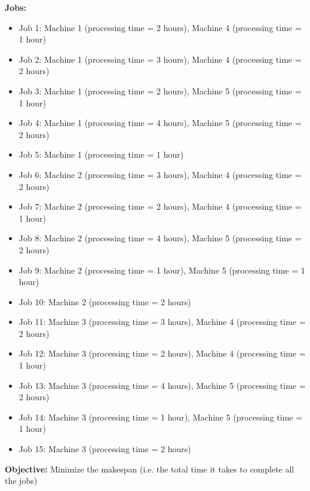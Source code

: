 {\textbf{Jobs:}
\begin{itemize}
    \item Job 1: Machine 1 (processing time = 2 hours), Machine 4 (processing time = 1 hour)
    \item Job 2: Machine 1 (processing time = 3 hours), Machine 4 (processing time = 2 hours)
    \item Job 3: Machine 1 (processing time = 2 hours), Machine 5 (processing time = 1 hour)
    \item Job 4: Machine 1 (processing time = 4 hours), Machine 5 (processing time = 2 hours)
    \item Job 5: Machine 1 (processing time = 1 hour)
    \item Job 6: Machine 2 (processing time = 3 hours), Machine 4 (processing time = 2 hours)
    \item Job 7: Machine 2 (processing time = 2 hours), Machine 4 (processing time = 1 hour)
    \item Job 8: Machine 2 (processing time = 4 hours), Machine 5 (processing time = 2 hours)
    \item Job 9: Machine 2 (processing time = 1 hour), Machine 5 (processing time = 1 hour)
    \item Job 10: Machine 2 (processing time = 2 hours)
    \item Job 11: Machine 3 (processing time = 3 hours), Machine 4 (processing time = 2 hours)
    \item Job 12: Machine 3 (processing time = 2 hours), Machine 4 (processing time = 1 hour)
    \item Job 13: Machine 3 (processing time = 4 hours), Machine 5 (processing time = 2 hours)
    \item Job 14: Machine 3 (processing time = 1 hour), Machine 5 (processing time = 1 hour)
    \item Job 15: Machine 3 (processing time = 2 hours)
\end{itemize}

\textbf{Objective:} Minimize the makespan (i.e. the total time it takes to complete all the jobs)

}
